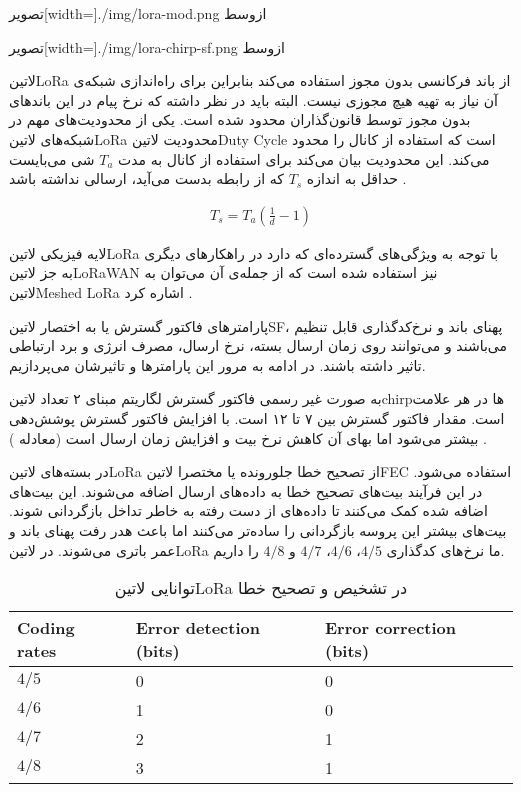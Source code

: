 ‌تصویر[width=\textwidth]{./img/lora-mod.png}
‌ازوسط

‌تصویر[width=\textwidth]{./img/lora-chirp-sf.png}
‌ازوسط

‌لاتین{LoRa} از باند فرکانسی بدون مجوز استفاده می‌کند بنابراین برای راه‌اندازی شبکه‌ی آن نیاز به تهیه هیچ مجوزی نیست. البته باید در نظر داشته که نرخ پیام در این باندهای بدون مجوز توسط قانون‌گذاران محدود شده است.
یکی از محدودیت‌های مهم در شبکه‌های ‌لاتین{LoRa} محدودیت ‌لاتین{Duty Cycle} است که استفاده از کانال را محدود می‌کند. این محدودیت بیان می‌کند برای استفاده از کانال به مدت $T_{a}$ شی می‌بایست
حداقل به اندازه $T_{s}$ که از رابطه  بدست می‌آید، ارسالی نداشته باشد
.

\begin{align}
  \label{معادله: چرخه وظیفه}
  T_{s} = T_{a}\left( \frac{1}{d} - 1 \right)
\end{align}

لایه فیزیکی ‌لاتین{LoRa} با توجه به ویژگی‌های گسترده‌ای که دارد در راهکارهای دیگری به جز ‌لاتین{LoRaWAN} نیز استفاده شده است که از جمله‌ی آن می‌توان به ‌لاتین{Meshed LoRa} اشاره کرد
.

پارامترهای فاکتور گسترش یا به اختصار ‌لاتین{SF}، پهنای باند و نرخ‌کدگذاری قابل تنظیم می‌باشند و می‌توانند روی زمان ارسال بسته، نرخ ارسال، مصرف انرژی و برد ارتباطی تاثیر داشته باشند.
در ادامه به مرور این پارامترها و تاثیرشان می‌پردازیم.

به صورت غیر رسمی فاکتور گسترش لگاریتم مبنای ۲ تعداد ‌لاتین{chirp}ها در هر علامت است. مقدار فاکتور گسترش بین ۷ تا ۱۲ است.
با افزایش فاکتور گسترش پوشش‌دهی بیشتر می‌شود اما بهای آن کاهش نرخ بیت و افزایش زمان ارسال است (معادله )
.

در بسته‌های ‌لاتین{LoRa} از تصحیح خطا جلورونده یا مختصرا ‌لاتین{FEC} استفاده می‌شود.
در این فرآیند بیت‌های تصحیح خطا به داده‌های ارسال اضافه می‌شوند.
این بیت‌های اضافه شده کمک می‌کنند تا داده‌های از دست رفته به خاطر تداخل بازگردانی شوند.
بیت‌های بیشتر این پروسه بازگردانی را ساده‌تر می‌کنند اما باعث هدر رفت پهنای باند و عمر باتری می‌شوند.
در ‌لاتین{LoRa} ما نرخ‌های کدگذاری $4/5$، $4/6$، $4/7$ و $4/8$ را داریم.

\begin{table}
\caption{توانایی ‌لاتین{LoRa} در تشخیص و تصحیح خطا }
\begin{latin}\begin{tabularx}
  {\textwidth}
  {|*{3}{X|}}
  \toprule
  Coding rates &
  Error detection (bits) &
  Error correction (bits) \\
  \midrule
  $4/5$ &
  0 &
  0 \\
  \midrule
  $4/6$ &
  1 &
  0 \\
  \midrule
  $4/7$ &
  2 &
  1 \\
  \midrule
  $4/8$ &
  3 &
  1 \\
  \bottomrule
\end{tabularx}\end{latin}
\end{table}

